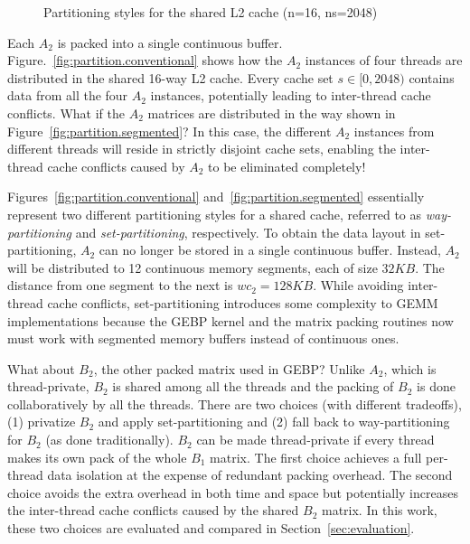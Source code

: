 \begin{figure}
  \centering
  \caption{Partitioning styles for the shared L2 cache (n=16, ns=2048)}
  \label{fig:partition}
\end{figure}

Each $A_2$ is packed into a single continuous buffer.
Figure.~\ref{fig:partition.conventional} shows how the
$A_2$ instances of four threads are distributed in the shared 16-way L2 cache.
Every cache set $s \in [0,2048)$ contains
data from all the four $A_2$ instances,
potentially leading to inter-thread cache conflicts.
What if the $A_2$ matrices are distributed in the way shown in
Figure~\ref{fig:partition.segmented}? In this case,
the different $A_2$ instances from different threads will
reside in strictly disjoint cache sets, enabling
the inter-thread cache conflicts caused by $A_2$ to be
eliminated completely!

Figures~\ref{fig:partition.conventional} and~\ref{fig:partition.segmented}
essentially represent two different partitioning styles for a shared cache,
referred to as \emph{way-partitioning} and \emph{set-partitioning}, respectively.
To obtain the data layout in set-partitioning,
$A_2$ can no longer be stored in a single continuous buffer.
Instead, $A_2$ will be distributed to 12 continuous memory segments, each of size $32KB$.
The distance from one segment to the next is $wc_2=128KB$.
While avoiding inter-thread cache conflicts,
set-partitioning
introduces some complexity to GEMM implementations
because the GEBP kernel and the matrix packing routines
now must work with segmented memory buffers instead of continuous ones.

What about $B_2$, the other packed matrix used in GEBP?
Unlike $A_2$, which is thread-private,
$B_2$ is shared among all the threads and
the packing of $B_2$ is done collaboratively by all
the threads.
There are two choices (with different tradeoffs), (1) privatize $B_2$ and apply 
set-partitioning and (2) 
fall back to way-partitioning for $B_2$ (as done
traditionally).
$B_2$ can be made thread-private if every thread makes
its own pack of the whole $B_1$ matrix.
The first choice achieves a full per-thread data isolation
at the expense of redundant packing overhead.
The second choice avoids the extra overhead in both time and space
but potentially increases the inter-thread cache
conflicts caused
by the shared $B_2$ matrix.
In this work, these two choices are evaluated
and compared in Section~\ref{sec:evaluation}.


